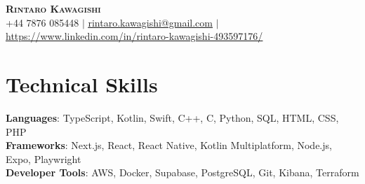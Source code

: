\documentclass[letterpaper,11pt]{article}
\begin{document}

\begin{center}
    \textbf{\Huge \scshape Rintaro Kawagishi} \\ \vspace{1pt}
    +44 7876 085448 $|$ 
		\href{mailto:rintaro.kawagishi@gmail.com}{\underline{rintaro.kawagishi@gmail.com}} $|$ 
    \href{https://www.linkedin.com/in/rintaro-kawagishi-493597176/}{\underline{https://www.linkedin.com/in/rintaro-kawagishi-493597176/}}
\end{center}

\section{Technical Skills}
 \begin{itemize}[leftmargin=0.15in, label={}]
    \small{\item{
     \textbf{Languages}{: TypeScript, Kotlin, Swift, C++, C, Python, SQL, HTML, CSS, PHP} \\
     \textbf{Frameworks}{: Next.js, React, React Native, Kotlin Multiplatform, Node.js, Expo, Playwright} \\
     \textbf{Developer Tools}{: AWS, Docker, Supabase, PostgreSQL, Git, Kibana, Terraform}
    }}
 \end{itemize}
\end{document}
